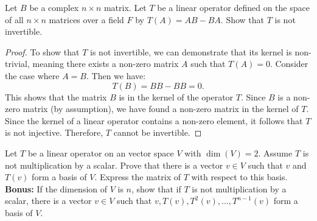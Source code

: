 \documentclass[openany]{book}
\begin{document}
\begin{exercise}
    Let $B$ be a complex $n\times n$ matrix. Let $T$ be a linear operator defined on the space of all $n \times n$ matrices over a field $F$ by $T(A) = AB - BA$. Show that $T$ is not invertible. 
\end{exercise}
\begin{proof}
To show that $T$ is not invertible, we can demonstrate that its kernel is non-trivial, meaning there exists a non-zero matrix $A$ such that $T(A) = 0$.
Consider the case where $A = B$. Then we have:
\[
T(B) = BB - BB = 0.
\]
This shows that the matrix $B$ is in the kernel of the operator $T$. Since $B$ is a non-zero matrix (by assumption), we have found a non-zero matrix in the kernel of $T$.
Since the kernel of a linear operator contains a non-zero element, it follows that $T$ is not injective. Therefore, $T$ cannot be invertible.
\end{proof}
\begin{exercise}
    Let $T$ be a linear operator on an vector space $V$ with $\dim(V) = 2$. Assume $T$ is not multiplication by a scalar. Prove that there is a vector $v \in V$ such that $v$ and $T(v)$ form a basis of $V$. Express the matrix of $T$ with respect to this basis. \\
    \textbf{Bonus: } If the dimension of $V$ is $n$, show that if $T$ is not multiplication by a scalar, there is a vector $v \in V$ such that $v, T(v), T^2(v), \ldots , T^{n-1}(v)$ form a basis of $V$.
\end{exercise}
\end{document}
